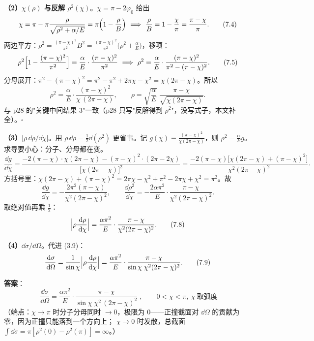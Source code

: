 \documentclass[11pt]{ctexart}
\begin{document}
\textbf{（2）$\chi(\rho)$ 与反解 $\rho^{2}(\chi)$}。$\chi=\pi-2\varphi_0$ 给出
\[
\chi=\pi-\pi\frac{\rho}{\sqrt{\rho^{2}+\alpha/E}}=\pi\Bigl(1-\frac{\rho}{B}\Bigr)
\ \Longrightarrow\
\frac{\rho}{B}=1-\frac{\chi}{\pi}=\frac{\pi-\chi}{\pi} . \tag{7.4}
\]
两边平方：$\rho^{2}=\frac{(\pi-\chi)^{2}}{\pi^{2}}B^{2}=\frac{(\pi-\chi)^{2}}{\pi^{2}}\bigl(\rho^{2}+\frac{\alpha}{E}\bigr)$，移项：
\[
\rho^{2}\Bigl[1-\frac{(\pi-\chi)^{2}}{\pi^{2}}\Bigr]=\frac{\alpha}{E}\cdot\frac{(\pi-\chi)^{2}}{\pi^{2}}
\ \Longrightarrow\
\rho^{2}=\frac{\alpha}{E}\cdot\frac{(\pi-\chi)^{2}}{\pi^{2}-(\pi-\chi)^{2}} . \tag{7.5}
\]
分母展开：$\pi^{2}-(\pi-\chi)^{2}=\pi^{2}-\pi^{2}+2\pi\chi-\chi^{2}=\chi(2\pi-\chi)$。所以
\[
\rho^{2}=\frac{\alpha}{E}\cdot\frac{(\pi-\chi)^{2}}{\chi\,(2\pi-\chi)} ,
\qquad
\rho=\sqrt{\frac{\alpha}{E}}\;\frac{\pi-\chi}{\sqrt{\chi(2\pi-\chi)}} . \tag{7.6}
\]
与 p28 的"关键中间结果 3"一致（p28 只写"反解得到 $\rho^{2}$"，没写式子，本文补全）。\hfill$\square$

\textbf{（3）$\bigl|\rho\,\dd\rho/\dd\chi\bigr|$}。用 $\rho\,\dd\rho=\frac12\dd(\rho^{2})$ 更省事。记 $g(\chi)\equiv\frac{(\pi-\chi)^{2}}{\chi(2\pi-\chi)}$，则 $\rho^{2}=\frac{\alpha}{E}g$。求导要小心：分子、分母都在变。
\[
\frac{\dd g}{\dd\chi}
=\frac{-2(\pi-\chi)\cdot\chi(2\pi-\chi)-(\pi-\chi)^{2}\cdot(2\pi-2\chi)}{\bigl[\chi(2\pi-\chi)\bigr]^{2}}
=\frac{-2(\pi-\chi)\bigl[\chi(2\pi-\chi)+(\pi-\chi)^{2}\bigr]}{\chi^{2}(2\pi-\chi)^{2}} .
\]
方括号里：$\chi(2\pi-\chi)+(\pi-\chi)^{2}=2\pi\chi-\chi^{2}+\pi^{2}-2\pi\chi+\chi^{2}=\pi^{2}$。故
\[
\frac{\dd g}{\dd\chi}=-\frac{2\pi^{2}(\pi-\chi)}{\chi^{2}(2\pi-\chi)^{2}},
\qquad
\frac{\dd\rho^{2}}{\dd\chi}=-\frac{2\alpha\pi^{2}}{E}\cdot\frac{\pi-\chi}{\chi^{2}(2\pi-\chi)^{2}} . \tag{7.7}
\]
取绝对值再乘 $\frac12$：
\[
\Bigl|\rho\frac{\,\mathrm{d}\rho}{\,\mathrm{d}\chi}\Bigr|=\frac{\alpha\pi^{2}}{E}\cdot\frac{\pi-\chi}{\chi^{2}(2\pi-\chi)^{2}} . \tag{7.8}
\]

\textbf{（4）$\dd\sigma/\dd\Omega$}。代进 (3.9)：
\[
\frac{\,\mathrm{d}\sigma}{\,\mathrm{d}\Omega}=\frac{1}{\sin\chi}\Bigl|\rho\frac{\,\mathrm{d}\rho}{\,\mathrm{d}\chi}\Bigr|
=\frac{\alpha\pi^{2}}{E}\cdot\frac{\pi-\chi}{\sin\chi\;\chi^{2}(2\pi-\chi)^{2}} . \tag{7.9}
\]

\textbf{答案}：
\[
\boxed{\;
\frac{\dd\sigma}{\dd\Omega}=\frac{\alpha\pi^{2}}{E}\cdot
\frac{\pi-\chi}{\sin\chi\;\chi^{2}\,(2\pi-\chi)^{2}}\;},
\qquad 0<\chi<\pi,\ \chi\ \text{取弧度}
\]
（端点：$\chi\to\pi$ 时分子分母同时 $\to0$，极限为 $0$——正撞截面对 $\dd\Omega$ 的贡献为零，因为正撞只能落到一个方向上；
$\chi\to0$ 时发散，总截面 $\int\dd\sigma=\pi[\rho^{2}(0)-\rho^{2}(\pi)]=\infty$。）
\end{document}
